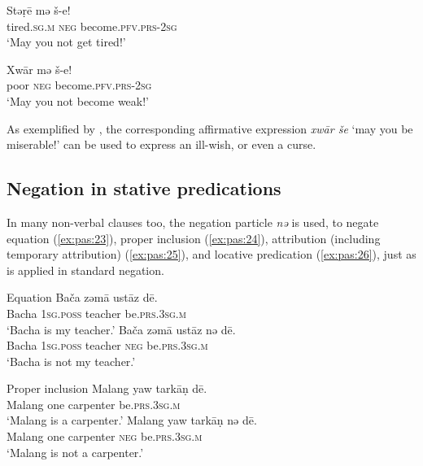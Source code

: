 \documentclass[output=paper,colorlinks,citecolor=brown]{langscibook}
\begin{document}
\ea\label{ex:pas:21} 
    \gll  Stəṛē mə š-e! \\ 
         tired.\textsc{sg.m} \textsc{neg} become.\textsc{pfv.prs{}-2sg} \\
    \glt ‘May you not get tired!’
\z 

\ea\label{ex:pas:22} 
    \gll Xwār mə š-e!  \\ 
          poor \textsc{neg} become.\textsc{pfv.prs-2sg}\\
    \glt ‘May you not become weak!’
\z 

As exemplified by \citet[275--276]{DavidGoodman2014}, the corresponding affirmative expression \textit{xwār še} ‘may you be miserable!’ can be used to express an ill-wish, or even a curse.

\subsection{Negation in stative predications}\label{sec:pas:2.3}

In many non-verbal clauses too, the negation particle \textit{nə} is used, to negate equation (\ref{ex:pas:23}), proper inclusion (\ref{ex:pas:24}), attribution (including temporary attribution) (\ref{ex:pas:25}), and locative predication (\ref{ex:pas:26}), just as is applied in standard negation. 

\ea\label{ex:pas:23} Equation
    \ea\label{ex:pas:23a}
        \gll Bača zəmā ust\={a}z d\={e}.  \\
             Bacha \textsc{1sg.poss} teacher be.\textsc{prs.3sg.m} \\
        \glt ‘Bacha is my teacher.’
    \ex\label{ex:pas:23b}
        \gll Bača zəmā ust\={a}z nə d\={e}. \\
             Bacha \textsc{1sg.poss} teacher \textsc{neg} be.\textsc{prs.3sg.m} \\
        \glt ‘Bacha is not my teacher.’ 
    \z
\z 

\ea\label{ex:pas:24} Proper inclusion
    \ea\label{ex:pas:24a}
        \gll Malang yaw tark\={a}ṇ d\={e}.  \\
              Malang one carpenter be.\textsc{prs.3sg.m}\\
        \glt ‘Malang is a carpenter.’
    \ex\label{ex:pas:24b}
        \gll Malang yaw tarkāṇ nə d\={e}.  \\
            Malang one carpenter \textsc{neg} be.\textsc{prs.3sg.m} \\
        \glt ‘Malang is not a carpenter.’
    \z
\z 
\end{document}
